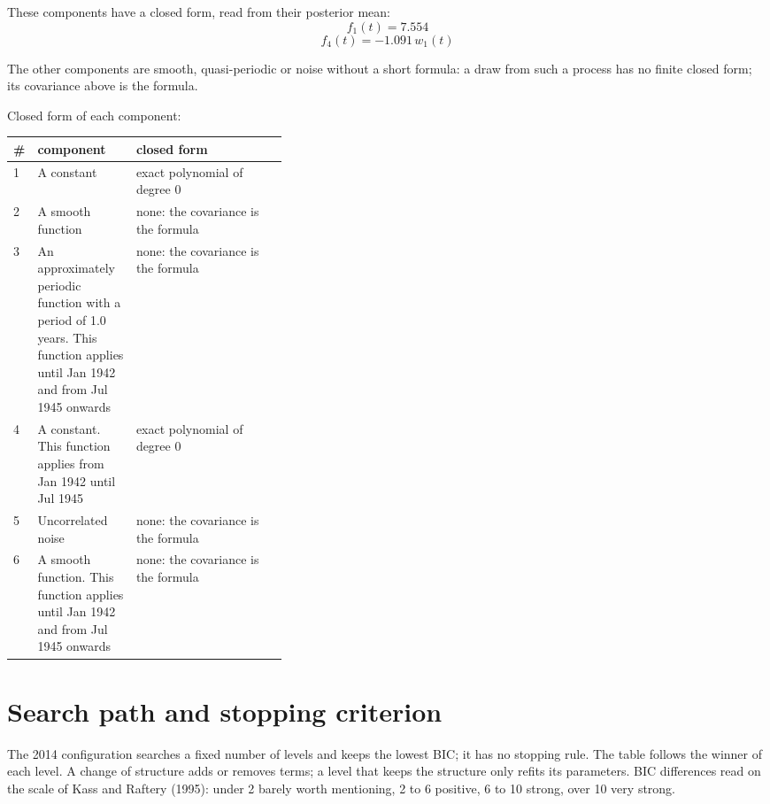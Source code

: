 \documentclass[11pt,a4paper]{article}
\begin{document}
These components have a closed form, read from their posterior mean:
\begin{dmath*}
f_{1}(t) = 7.554
\end{dmath*}
\begin{dmath*}
f_{4}(t) = -1.091\,w_{1}(t)
\end{dmath*}

The other components are smooth, quasi-periodic or noise without a short formula: a draw from such a process has no finite closed form; its covariance above is the formula.

Closed form of each component:

\begin{center}\footnotesize
\begin{tabular}{lp{0.36\linewidth}l}
\toprule
\# & component & closed form \\
\midrule
1 & A constant & exact polynomial of degree 0 \\
2 & A smooth function & none: the covariance is the formula \\
3 & An approximately periodic function with a period of 1.0 years. This function applies until Jan 1942 and from Jul 1945 onwards & none: the covariance is the formula \\
4 & A constant. This function applies from Jan 1942 until Jul 1945 & exact polynomial of degree 0 \\
5 & Uncorrelated noise & none: the covariance is the formula \\
6 & A smooth function. This function applies until Jan 1942 and from Jul 1945 onwards & none: the covariance is the formula \\
\bottomrule
\end{tabular}
\end{center}

\section*{Search path and stopping criterion}

The 2014 configuration searches a fixed number of levels and keeps the lowest BIC; it has no stopping rule. The table follows the winner of each level. A change of structure adds or removes terms; a level that keeps the structure only refits its parameters. BIC differences read on the scale of Kass and Raftery (1995): under 2 barely worth mentioning, 2 to 6 positive, 6 to 10 strong, over 10 very strong.
\end{document}
